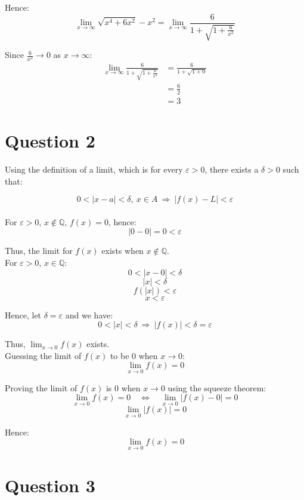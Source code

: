 \documentclass[11pt]{article}
\begin{document}
Hence:
\[\lim_{x \rightarrow \infty} \sqrt{x^4 + 6x^2} - x^2 = \lim_{x \rightarrow \infty} \frac{6}{1 + \sqrt{1 + \frac{6}{x^2}}}\]

Since \(\frac{6}{x^2} \rightarrow 0\) as \(x \rightarrow \infty\):
\begin{align*}
\lim_{x \rightarrow \infty} \frac{6}{1 + \sqrt{1 + \frac{6}{x^2}}} &= \frac{6}{1 + \sqrt{1 + 0}} \\
&= \frac{6}{2} \\
&= 3
\end{align*}


\section{Question 2}
\label{sec:orgf72e0a1}

Using the definition of a limit, which is for every \(\varepsilon > 0\), there exists a \(\delta > 0\) such that:

\[0 < |x - a| < \delta, \ x \in A \ \Rightarrow \ |f(x) - L| < \varepsilon\]
\\[0pt]

For \(\varepsilon > 0\), \(x \notin \mathbb{Q}\), \(f(x) = 0\), hence:
\[|0 - 0| = 0 < \varepsilon\]

Thus, the limit for \(f(x)\) exists when \(x \notin \mathbb{Q}\).
\\[0pt]

For \(\varepsilon > 0\), \(x \in \mathbb{Q}\):
\[0 < |x - 0| < \delta\]
\[|x| < \delta\]
\[f(|x|) < \varepsilon\]
\[x < \varepsilon\]

Hence, let \(\delta = \varepsilon\) and we have:
\[0 < |x| < \delta \ \Rightarrow \ |f(x)| < \delta = \varepsilon\]

Thus, \(\lim_{x \rightarrow 0} f(x)\) exists.
\\[0pt]

Guessing the limit of \(f(x)\) to be 0 when \(x \rightarrow 0\):
\[\lim_{x \rightarrow 0} f(x) = 0\]

Proving the limit of \(f(x)\) is 0 when \(x \rightarrow 0\) using the squeeze theorem:
\[\lim_{x \rightarrow 0} f(x) = 0 \quad \Leftrightarrow \quad \lim_{x \rightarrow 0}|f(x) - 0| = 0\]
\[\lim_{x \rightarrow 0} |f(x)| = 0\]

Hence:
\[\lim_{x \rightarrow 0} f(x) = 0\]

\section{Question 3}
\label{sec:orge75b8e7}
\end{document}
